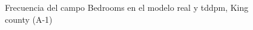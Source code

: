 \begin{figure}[H]
    \centering
    
    \caption{Frecuencia del campo Bedrooms en el modelo real y tddpm, King county (A-1)}
    \label{frecuency-tddpm-bedrooms}
\end{figure}